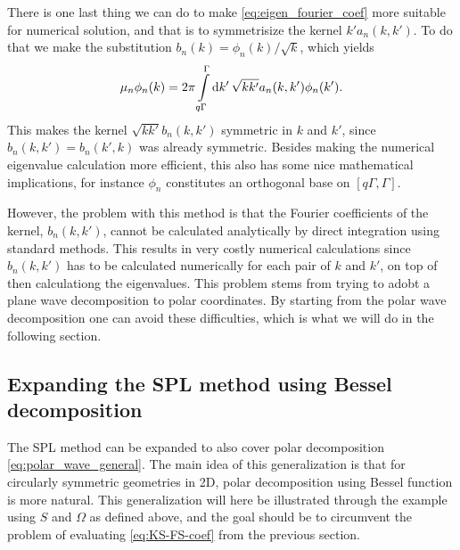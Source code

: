 \documentclass[11pt,a4paper, 
swedish,english %
]{article}
\begin{document}
There is one last thing we can do to make
\eqref{eq:eigen_fourier_coef} more suitable for numerical solution,
and that is to symmetrisize the kernel $k'a_n(k, k')$. To do that we
make the substitution $b_n(k)=\phi_n(k)/\sqrt{k}$, which yields
\begin{equation}
\mu_n \phi_n(k) = 2\pi\int_{q\Gamma}^\Gamma\rd{k'}\,
\sqrt{kk'}a_n(k, k') \phi_n(k').
\end{equation}
This makes the kernel $\sqrt{kk'}b_n(k, k')$ symmetric in $k$ and
$k'$, since $b_n(k, k')=b_n(k', k)$ was already symmetric. Besides
making the numerical eigenvalue calculation more efficient, this also
has some nice mathematical implications, for instance $\phi_n$
constitutes an orthogonal base on $[q\Gamma, \Gamma]$.

However, the problem with this method is that the Fourier coefficients
of the kernel, $b_n(k, k')$, cannot be calculated analytically by
direct integration using standard methods. This results in very costly
numerical calculations since $b_n(k, k')$ has to be calculated
numerically for each pair of $k$ and $k'$, on top of then calculationg
the eigenvalues. 
This problem stems from trying to adobt a plane wave decomposition to
polar coordinates. By starting from the polar wave decomposition one
can avoid these difficulties, which is what we will do in the
following section. 


\subsection{Expanding the SPL method using Bessel decomposition}
The SPL method can be expanded to also cover polar decomposition
\eqref{eq:polar_wave_general}. The main idea of this generalization is
that for circularly symmetric geometries in 2D, polar decomposition
using Bessel function is more natural. 
This generalization will here be illustrated through the example using
$S$ and $\Omega$ as defined above, and the goal should be to
circumvent the problem of evaluating \eqref{eq:KS-FS-coef} from the
previous section.
\end{document}
